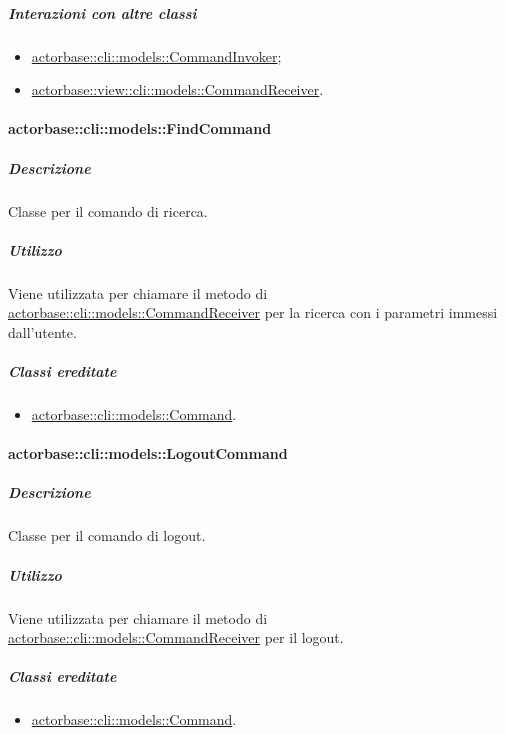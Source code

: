 \documentclass{scalatekids-article}
\begin{document}
\subparagraph{Interazioni con altre classi}

\begin{itemize}
\item \hyperref[sec:actorbase::cli::models::CommandInvoker]{actorbase::cli::models::CommandInvoker};
\item \hyperref[sec:actorbase::view::cli::models::CommandReceiver]{actorbase::view::cli::models::CommandReceiver}.
\end{itemize}

\paragraph{actorbase::cli::models::FindCommand}
\label{sec:actorbase::cli::models::FindCommand}

\subparagraph{Descrizione}

Classe per il comando di ricerca.

\subparagraph{Utilizzo}

Viene utilizzata per chiamare il metodo di
\hyperref[sec:actorbase::cli::models::CommandReceiver]{actorbase::cli::models::CommandReceiver} per la ricerca con i parametri immessi
dall'utente.

\subparagraph{Classi ereditate}

\begin{itemize}
\item \hyperref[sec:actorbase::cli::models::Command]{actorbase::cli::models::Command}.
\end{itemize}

\paragraph{actorbase::cli::models::LogoutCommand}
\label{sec:actorbase::cli::models::LogoutCommand}

\subparagraph{Descrizione}

Classe per il comando di logout.

\subparagraph{Utilizzo}

Viene utilizzata per chiamare il metodo di
\hyperref[sec:actorbase::cli::models::CommandReceiver]{actorbase::cli::models::CommandReceiver} per il logout.

\subparagraph{Classi ereditate}

\begin{itemize}
\item \hyperref[sec:actorbase::cli::models::Command]{actorbase::cli::models::Command}.
\end{itemize}
\end{document}
